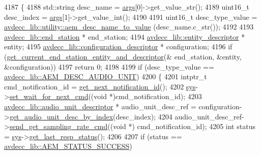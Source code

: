 \begin{DoxyCode}
4187 \{
4188     std::string desc\_name = \hyperlink{namespaceastime__fitline_a8187411843a6284ffb964ef3fb9fcab3}{args}[0]->get\_value\_str();
4189     uint16\_t desc\_index = \hyperlink{namespaceastime__fitline_a8187411843a6284ffb964ef3fb9fcab3}{args}[1]->get\_value\_int();
4190 
4191     uint16\_t desc\_type\_value = \hyperlink{namespaceavdecc__lib_1_1utility_a9f6076e32fa227555a95b6e95ea1e29b}{avdecc\_lib::utility::aem\_desc\_name\_to\_value}
      (desc\_name.c\_str());
4192 
4193     \hyperlink{classavdecc__lib_1_1end__station}{avdecc\_lib::end\_station} * end\_station;
4194     \hyperlink{classavdecc__lib_1_1entity__descriptor}{avdecc\_lib::entity\_descriptor} * entity;
4195     \hyperlink{classavdecc__lib_1_1configuration__descriptor}{avdecc\_lib::configuration\_descriptor} * configuration;
4196     \textcolor{keywordflow}{if} (\hyperlink{classcmd__line_ac2d4611fba7db03d436a2e3c1e64828e}{get\_current\_end\_station\_entity\_and\_descriptor}(&
      end\_station, &entity, &configuration))
4197         \textcolor{keywordflow}{return} 0;
4198 
4199     \textcolor{keywordflow}{if} (desc\_type\_value == \hyperlink{namespaceavdecc__lib_ac7b7d227e46bc72b63ee9e9aae15902fa141a799bfb339b5ff7543722da1119e2}{avdecc\_lib::AEM\_DESC\_AUDIO\_UNIT})
4200     \{
4201         intptr\_t cmd\_notification\_id = \hyperlink{classcmd__line_a57486218387d1aa9d262eb7c176154ad}{get\_next\_notification\_id}();
4202         \hyperlink{classcmd__line_a485db4800e331cb4052c447fdf5d154e}{sys}->\hyperlink{classavdecc__lib_1_1system_a26b769584f10225077da47583edda33e}{set\_wait\_for\_next\_cmd}((\textcolor{keywordtype}{void} *)cmd\_notification\_id);
4203         \hyperlink{classavdecc__lib_1_1audio__unit__descriptor}{avdecc\_lib::audio\_unit\_descriptor} * audio\_unit\_desc\_ref = 
      configuration->\hyperlink{classavdecc__lib_1_1configuration__descriptor_aa723a66eba00ad8c8f5361951f5af6e7}{get\_audio\_unit\_desc\_by\_index}(desc\_index);
4204         audio\_unit\_desc\_ref->\hyperlink{classavdecc__lib_1_1audio__unit__descriptor_ab16e2c5bb480e42abba205e0f1cbf2ea}{send\_get\_sampling\_rate\_cmd}((\textcolor{keywordtype}{void} *)
      cmd\_notification\_id);
4205         \textcolor{keywordtype}{int} status = \hyperlink{classcmd__line_a485db4800e331cb4052c447fdf5d154e}{sys}->\hyperlink{classavdecc__lib_1_1system_aa63e8d1a4e51f695cdcccc9340922407}{get\_last\_resp\_status}();
4206 
4207         \textcolor{keywordflow}{if} (status == \hyperlink{namespaceavdecc__lib_affd436edb2cecd20cfd784a84f852b2bac947077909cb590b84f4b5db413080e0}{avdecc\_lib::AEM\_STATUS\_SUCCESS})

\end{DoxyCode}
